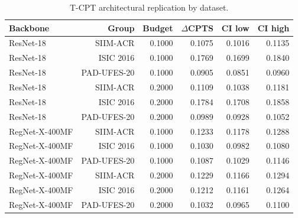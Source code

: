 \begin{table}[t]
\centering
\caption{T-CPT architectural replication by dataset.}
\label{tab:tcpt_backbone_dataset}
\begin{tabular}{lrrrrr}
\toprule
Backbone & Group & Budget & $\Delta$CPTS & CI low & CI high \\
\midrule
ResNet-18 & SIIM-ACR & 0.1000 & 0.1075 & 0.1016 & 0.1135 \\
ResNet-18 & ISIC 2016 & 0.1000 & 0.1769 & 0.1699 & 0.1840 \\
ResNet-18 & PAD-UFES-20 & 0.1000 & 0.0905 & 0.0851 & 0.0960 \\
ResNet-18 & SIIM-ACR & 0.2000 & 0.1109 & 0.1038 & 0.1181 \\
ResNet-18 & ISIC 2016 & 0.2000 & 0.1784 & 0.1708 & 0.1858 \\
ResNet-18 & PAD-UFES-20 & 0.2000 & 0.0989 & 0.0928 & 0.1052 \\
RegNet-X-400MF & SIIM-ACR & 0.1000 & 0.1233 & 0.1178 & 0.1288 \\
RegNet-X-400MF & ISIC 2016 & 0.1000 & 0.1030 & 0.0982 & 0.1080 \\
RegNet-X-400MF & PAD-UFES-20 & 0.1000 & 0.1087 & 0.1029 & 0.1146 \\
RegNet-X-400MF & SIIM-ACR & 0.2000 & 0.1229 & 0.1166 & 0.1294 \\
RegNet-X-400MF & ISIC 2016 & 0.2000 & 0.1212 & 0.1161 & 0.1264 \\
RegNet-X-400MF & PAD-UFES-20 & 0.2000 & 0.1032 & 0.0965 & 0.1100 \\
\bottomrule
\end{tabular}
\end{table}

